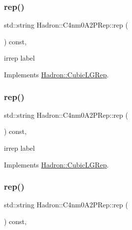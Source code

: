 \subsubsection{\texorpdfstring{rep()}{rep()}\hspace{0.1cm}{\footnotesize\ttfamily [1/3]}}
{\footnotesize\ttfamily std\+::string Hadron\+::\+C4nm0\+A2\+P\+Rep\+::rep (\begin{DoxyParamCaption}{ }\end{DoxyParamCaption}) const\hspace{0.3cm}{\ttfamily [inline]}, {\ttfamily [virtual]}}

irrep label 

Implements \mbox{\hyperlink{structHadron_1_1CubicLGRep_a50f5ddbb8f4be4cee0106fa9e8c75e6c}{Hadron\+::\+Cubic\+L\+G\+Rep}}.

\mbox{\label{structHadron_1_1C4nm0A2PRep_a0a9ce5aff0ffd7d30bc9137951983b54}} 
\subsubsection{\texorpdfstring{rep()}{rep()}\hspace{0.1cm}{\footnotesize\ttfamily [2/3]}}
{\footnotesize\ttfamily std\+::string Hadron\+::\+C4nm0\+A2\+P\+Rep\+::rep (\begin{DoxyParamCaption}{ }\end{DoxyParamCaption}) const\hspace{0.3cm}{\ttfamily [inline]}, {\ttfamily [virtual]}}

irrep label 

Implements \mbox{\hyperlink{structHadron_1_1CubicLGRep_a50f5ddbb8f4be4cee0106fa9e8c75e6c}{Hadron\+::\+Cubic\+L\+G\+Rep}}.

\mbox{\label{structHadron_1_1C4nm0A2PRep_a0a9ce5aff0ffd7d30bc9137951983b54}} 
\subsubsection{\texorpdfstring{rep()}{rep()}\hspace{0.1cm}{\footnotesize\ttfamily [3/3]}}
{\footnotesize\ttfamily std\+::string Hadron\+::\+C4nm0\+A2\+P\+Rep\+::rep (\begin{DoxyParamCaption}{ }\end{DoxyParamCaption}) const\hspace{0.3cm}{\ttfamily [inline]}, {\ttfamily [virtual]}}


